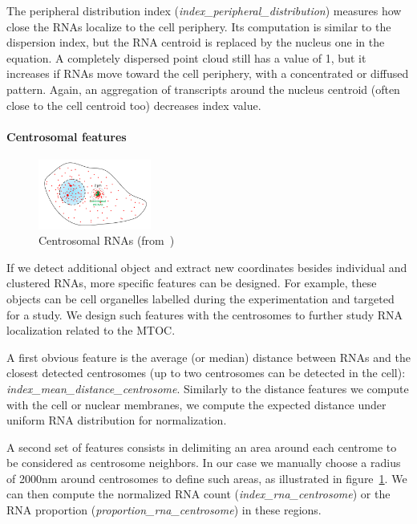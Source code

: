 The peripheral distribution index (\emph{index\_peripheral\_distribution}) measures how close the \ac{RNA}s localize to the cell periphery.
Its computation is similar to the dispersion index, but the \ac{RNA} centroid is replaced by the nucleus one in the equation.
A completely dispersed point cloud still has a value of 1, but it increases if \ac{RNA}s move toward the cell periphery, with a concentrated or diffused pattern.
Again, an aggregation of transcripts around the nucleus centroid (often close to the cell centroid too) decreases index value.

\paragraph{Centrosomal features}

\begin{figure}
  \begin{center}
    \includegraphics[width=0.33\textwidth]{figures/chapter4/centrosomal_features}
  \end{center}
  \caption{Centrosomal \ac{RNA}s (from~\cite{safieddine_choreography_2021})}
  \label{fig:centrosome_features}
\end{figure}

If we detect additional object and extract new coordinates besides individual and clustered \ac{RNA}s, more specific features can be designed.
For example, these objects can be cell organelles labelled during the experimentation and targeted for a study.
We design such features with the centrosomes to further study \ac{RNA} localization related to the \ac{MTOC}.

A first obvious feature is the average (or median) distance between \ac{RNA}s and the closest detected centrosomes (up to two centrosomes can be detected in the cell): \emph{index\_mean\_distance\_centrosome}.
Similarly to the distance features we compute with the cell or nuclear membranes, we compute the expected distance under uniform \ac{RNA} distribution for normalization.

A second set of features consists in delimiting an area around each centrome to be considered as centrosome neighbors.
In our case we manually choose a radius of 2000nm around centrosomes to define such areas, as illustrated in figure~\ref{fig:centrosome_features}.
We can then compute the normalized \ac{RNA} count (\emph{index\_rna\_centrosome}) or the \ac{RNA} proportion (\emph{proportion\_rna\_centrosome}) in these regions.

